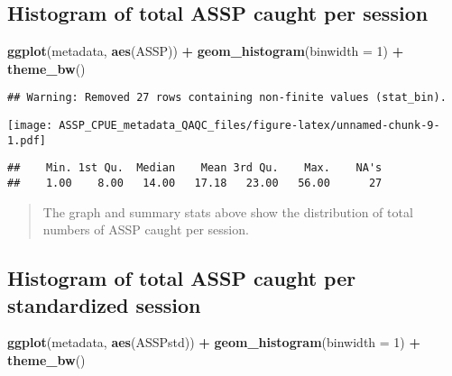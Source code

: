 \documentclass[
]{article}
\newenvironment{Shaded}{\begin{snugshade}}{\end{snugshade}}
\newcommand{\CommentTok}[1]{\textcolor[rgb]{0.56,0.35,0.01}{\textit{#1}}}
\newcommand{\DataTypeTok}[1]{\textcolor[rgb]{0.13,0.29,0.53}{#1}}
\newcommand{\DecValTok}[1]{\textcolor[rgb]{0.00,0.00,0.81}{#1}}
\newcommand{\KeywordTok}[1]{\textcolor[rgb]{0.13,0.29,0.53}{\textbf{#1}}}
\newcommand{\NormalTok}[1]{#1}
\newcommand{\OperatorTok}[1]{\textcolor[rgb]{0.81,0.36,0.00}{\textbf{#1}}}
\newcommand{\StringTok}[1]{\textcolor[rgb]{0.31,0.60,0.02}{#1}}
\begin{document}
\hypertarget{histogram-of-total-assp-caught-per-session}{%
\subsection{Histogram of total ASSP caught per
session}\label{histogram-of-total-assp-caught-per-session}}

\begin{Shaded}
\begin{Highlighting}[]
\KeywordTok{ggplot}\NormalTok{(metadata, }\KeywordTok{aes}\NormalTok{(ASSP)) }\OperatorTok{+}
\StringTok{  }\KeywordTok{geom_histogram}\NormalTok{(}\DataTypeTok{binwidth =} \DecValTok{1}\NormalTok{) }\OperatorTok{+}
\StringTok{  }\KeywordTok{theme_bw}\NormalTok{()}
\end{Highlighting}
\end{Shaded}

\begin{verbatim}
## Warning: Removed 27 rows containing non-finite values (stat_bin).
\end{verbatim}

\texttt{[image: ASSP\_CPUE\_metadata\_QAQC\_files/figure-latex/unnamed-chunk-9-1.pdf]}

\begin{Shaded}
\end{Shaded}

\begin{verbatim}
##    Min. 1st Qu.  Median    Mean 3rd Qu.    Max.    NA's 
##    1.00    8.00   14.00   17.18   23.00   56.00      27
\end{verbatim}

\begin{quote}
The graph and summary stats above show the distribution of total numbers
of ASSP caught per session.
\end{quote}

\hypertarget{histogram-of-total-assp-caught-per-standardized-session}{%
\subsection{Histogram of total ASSP caught per standardized
session}\label{histogram-of-total-assp-caught-per-standardized-session}}

\begin{Shaded}
\begin{Highlighting}[]
\KeywordTok{ggplot}\NormalTok{(metadata, }\KeywordTok{aes}\NormalTok{(ASSPstd)) }\OperatorTok{+}
\StringTok{  }\KeywordTok{geom_histogram}\NormalTok{(}\DataTypeTok{binwidth =} \DecValTok{1}\NormalTok{) }\OperatorTok{+}
\StringTok{  }\KeywordTok{theme_bw}\NormalTok{()}
\end{Highlighting}
\end{Shaded}
\end{document}
